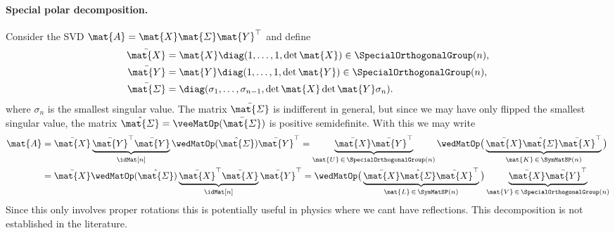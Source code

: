\paragraph{Special polar decomposition.}
Consider the SVD $\mat{A} = \mat{X} \mat{\varSigma} \mat{Y}^\top$ and define 
\begin{subequations}
\begin{align}
 \bar{\mat{X}} &= \mat{X} \diag(1, \ldots, 1, \det\mat{X}) \in \SpecialOrthogonalGroup(n),
\\
 \bar{\mat{Y}} &= \mat{Y} \diag(1, \ldots, 1, \det\mat{Y}) \in \SpecialOrthogonalGroup(n),
\\
 \bar{\mat{\varSigma}} &= \diag(\sigma_1, \ldots, \sigma_{n-1}, \det\mat{X}\det\mat{Y} \sigma_n).
\end{align} 
\end{subequations}
where $\sigma_n$ is the smallest singular value.
The matrix $\bar{\mat{\varSigma}}$ is indifferent in general, but since we may have only flipped the smallest singular value, the matrix $\hat{\mat{\varSigma}} = \veeMatOp(\bar{\mat{\varSigma}})$ is positive semidefinite.
With this we may write
\begin{subequations}
\begin{align}
 \mat{A} 
 &= \bar{\mat{X}} \underbrace{\bar{\mat{Y}}^\top \bar{\mat{Y}}}_{\idMat[n]} \wedMatOp(\hat{\mat{\varSigma}}) \bar{\mat{Y}}^\top
 = \underbrace{\bar{\mat{X}} \bar{\mat{Y}}^\top}_{\mat{U}\,\in\,\SpecialOrthogonalGroup(n)} \wedMatOp\big(\underbrace{\bar{\mat{X}} \hat{\mat{\varSigma}} \bar{\mat{X}}^\top}_{\mat{K}\,\in\,\SymMatSP(n)}\big)
\\
 &= \bar{\mat{X}} \wedMatOp(\hat{\mat{\varSigma}}) \underbrace{\bar{\mat{X}}^\top \bar{\mat{X}}}_{\idMat[n]} \bar{\mat{Y}}^\top
 = \wedMatOp\big(\underbrace{\bar{\mat{X}} \hat{\mat{\varSigma}} \bar{\mat{X}}^\top}_{\mat{L}\,\in\,\SymMatSP(n)}\big) \underbrace{\bar{\mat{X}} \bar{\mat{Y}}^\top}_{\mat{V}\,\in\,\SpecialOrthogonalGroup(n)}
\end{align}
\end{subequations}
Since this only involves proper rotations this is potentially useful in physics where we cant have reflections.
This decomposition is not established in the literature.

